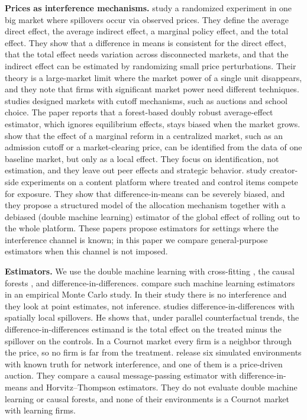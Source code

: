 \documentclass[11pt]{article}
\begin{document}
\textbf{Prices as interference mechanisms.} \citet{mkw2025} study a randomized experiment in one big market where spillovers occur via observed prices. They define the average direct effect, the average indirect effect, a marginal policy effect, and the total effect. They show that a difference in means is consistent for the direct effect, that the total effect needs variation across disconnected markets, and that the indirect effect can be estimated by randomizing small price perturbations. Their theory is a large-market limit where the market power of a single unit disappears, and they note that firms with significant market power need different techniques. \citet{munro2026} studies designed markets with cutoff mechanisms, such as auctions and school choice. The paper reports that a forest-based doubly robust average-effect estimator, which ignores equilibrium effects, stays biased when the market grows. \citet{arkhangelsky2025} show that the effect of a marginal reform in a centralized market, such as an admission cutoff or a market-clearing price, can be identified from the data of one baseline market, but only as a local effect. They focus on identification, not estimation, and they leave out peer effects and strategic behavior. \citet{zhan2026} study creator-side experiments on a content platform where treated and control items compete for exposure. They show that difference-in-means can be severely biased, and they propose a structured model of the allocation mechanism together with a debiased (double machine learning) estimator of the global effect of rolling out to the whole platform. These papers propose estimators for settings where the interference channel is known; in this paper we compare general-purpose estimators when this channel is not imposed.

\textbf{Estimators.} We use the double machine learning with cross-fitting \citep{chernozhukov2018}, the causal forests \citep{wager2018,athey2019}, and difference-in-differences. \citet{knaus2021} compare such machine learning estimators in an empirical Monte Carlo study. In their study there is no interference and they look at point estimates, not inference. \citet{butts2023} studies difference-in-differences with spatially local spillovers. He shows that, under parallel counterfactual trends, the difference-in-differences estimand is the total effect on the treated minus the spillover on the controls. In a Cournot market every firm is a neighbor through the price, so no firm is far from the treatment. \citet{shirani2025} release six simulated environments with known truth for network interference, and one of them is a price-driven auction. They compare a causal message-passing estimator with difference-in-means and Horvitz--Thompson estimators. They do not evaluate double machine learning or causal forests, and none of their environments is a Cournot market with learning firms.
\end{document}
